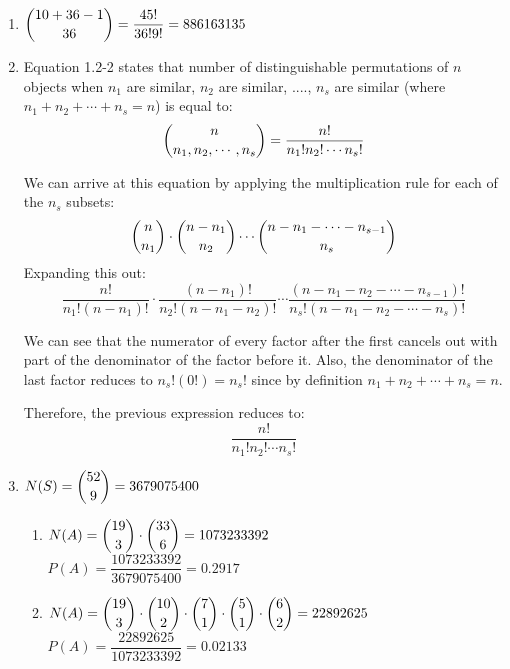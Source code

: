 \documentclass{article}
\begin{document}
\begin{enumerate}
      \item $\dbinom{10+36-1}{36} = \dfrac{45!}{36!9!} = 886163135$
      
      \item 
	Equation 1.2-2 states that number of distinguishable permutations of $n$ objects when $n_1$ 
	are similar, $n_2$ are similar, ...., $n_s$ are similar (where $n_1+n_2+\cdots+n_s = n$)
	is equal to:
	$$ \dbinom{n}{n_1,n_2,\cdots,n_s} = \dfrac{n!}{n_1!n_2!\cdots n_s!} $$

	We can arrive at this equation by applying the multiplication rule for each of the $n_s$ 
	subsets:
	$$\dbinom{n}{n_1}\cdot\dbinom{n-n_1}{n_2}\cdots\dbinom{n-n_1-\cdots-n_{s-1}}{n_s}$$
	Expanding this out:
	$$\dfrac{n!}{n_1!(n-n_1)!}\cdot\dfrac{(n-n_1)!}{n_2!(n-n_1-n_2)!}\cdots\dfrac{(n-n_1-n_2-\cdots-n_{s-1})!}{n_s!(n-n_1-n_2-\cdots-n_s)!}$$
	
	We can see that the numerator of every factor after the first cancels out with part of the
	denominator of the factor before it. Also, the denominator of the last factor reduces to
	$n_s!(0!) = n_s!$ since by definition $n_1+n_2+\cdots+n_s = n$. 
	
	Therefore, the previous expression reduces to:
	$$\dfrac{n!}{n_1!n_2!\cdots n_s!}$$
	
      \item
	$N(S) = \dbinom{52}{9} = 3679075400$
	\begin{enumerate}
	 \item
	    $N(A) = \dbinom{19}{3} \cdot \dbinom{33}{6} = 1073233392$ \\
	    $P(A) = \dfrac{1073233392}{3679075400} = 0.2917$
	 \item 
	    $N(A) = \dbinom{19}{3}\cdot\dbinom{10}{2}\cdot\dbinom{7}{1}\cdot\dbinom{5}{1}\cdot\dbinom{6}{2} = 22892625$ \\
	    $P(A) = \dfrac{22892625}{1073233392} = 0.02133$
	\end{enumerate}


\end{enumerate}
\end{document}
